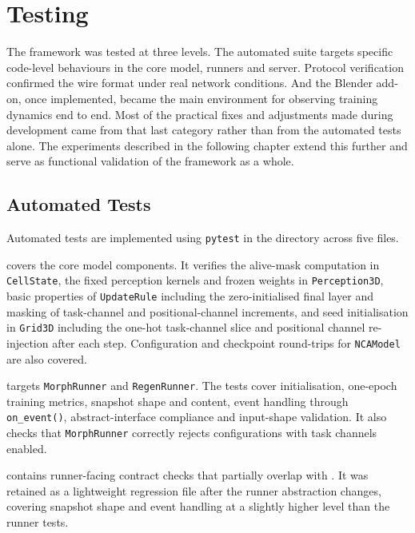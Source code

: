 \chapter{Testing}

The framework was tested at three levels. The automated suite targets specific
code-level behaviours in the core model, runners and server. Protocol
verification confirmed the wire format under real network conditions. And the
Blender add-on, once implemented, became the main environment for observing
training dynamics end to end. Most of the practical fixes and adjustments made
during development came from that last category rather than from the automated
tests alone. The experiments described in the following chapter extend this
further and serve as functional validation of the framework as a whole.

\section{Automated Tests}

Automated tests are implemented using \texttt{pytest} in the 
directory across five files.

 covers the core model components. It verifies the
alive-mask computation in \texttt{CellState}, the fixed perception kernels and
frozen weights in \texttt{Perception3D}, basic properties of
\texttt{UpdateRule} including the zero-initialised final layer and masking of
task-channel and positional-channel increments, and seed initialisation in
\texttt{Grid3D} including the one-hot task-channel slice and positional channel
re-injection after each step. Configuration and checkpoint round-trips for
\texttt{NCAModel} are also covered.

 targets \texttt{MorphRunner} and
\texttt{RegenRunner}. The tests cover initialisation, one-epoch training
metrics, snapshot shape and content, event handling through
\texttt{on\_event()}, abstract-interface compliance and input-shape validation.
It also checks that \texttt{MorphRunner} correctly rejects configurations with
task channels enabled.

 contains runner-facing contract checks that
partially overlap with . It was retained as a
lightweight regression file after the runner abstraction changes, covering
snapshot shape and event handling at a slightly higher level than the runner
tests.

